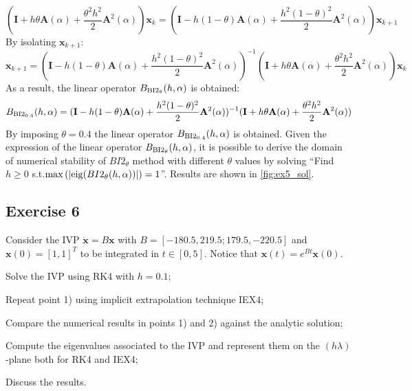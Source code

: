 \documentclass[11pt,a4paper,oneside]{article}
\renewcommand{\vec}[1]{\mathbf{#1}}
\begin{document}
\begin{equation}
    (\vec{I} + h\theta\vec{A}(\alpha) + \frac{\theta^2h^2}{2}\vec{A}^2(\alpha))\vec{x}_k = (\vec{I} - h(1-\theta)\vec{A}(\alpha) + \frac{h^2(1-\theta)^2}{2}\vec{A}^2(\alpha))\vec{x}_{k+1}
\end{equation}
By isolating $\vec{x}_{k+1}$:
\begin{equation}
    \vec{x}_{k+1} = (\vec{I} - h(1-\theta)\vec{A}(\alpha) + \frac{h^2(1-\theta)^2}{2}\vec{A}^2(\alpha))^{-1}(\vec{I} + h\theta\vec{A}(\alpha) + \frac{\theta^2h^2}{2}\vec{A}^2(\alpha))\vec{x}_k
\end{equation}
As a result, the linear operator $B_{\rm BI2_{\theta}}(h,\alpha)$ is obtained:
\begin{equation}
    B_{\rm BI2_{0.4}}(h,\alpha) = (\vec{I} - h(1-\theta)\vec{A}(\alpha) + \frac{h^2(1-\theta)^2}{2}\vec{A}^2(\alpha))^{-1}(\vec{I} + h\theta\vec{A}(\alpha) + \frac{\theta^2h^2}{2}\vec{A}^2(\alpha))
\end{equation}
By imposing $\theta = 0.4$ the linear operator $B_{\rm BI2_{0.4}}(h,\alpha)$ is obtained.
Given the expression of the linear operator $B_{\rm BI2_{\theta}}(h,\alpha)$, it is possible to derive the domain of numerical stability of $BI2_{\theta}$ method with different $\theta$ values by solving ``Find $h\ge 0$ s.t.$\max\left(|{\rm eig}(BI2_{\theta}(h,\alpha))|\right) = 1$''. Results are shown in \autoref{fig:ex5_sol}.

\subsection*{Exercise 6}

Consider the IVP $\dot{\vec x} = B \vec x$ with $B =[-180.5, 219.5; 179.5, -220.5]$ and $\vec{x}(0)=[1, 1]^T$ to be integrated in $t\in[0, 5]$. Notice that $\vec{x}(t)=e^{Bt}\vec{x}(0)$.
\begin{enumerate*}[label=\arabic*)]
    \item Solve the IVP using RK4 with $h=0.1$;
    \item Repeat point 1) using implicit extrapolation technique IEX4;
    \item Compare the numerical results in points 1) and 2) against the analytic solution;
    \item Compute the eigenvalues associated to the IVP and represent them on the $(h\lambda)$-plane both for RK4 and IEX4;
    \item Discuss the results.
\end{enumerate*}
\end{document}
